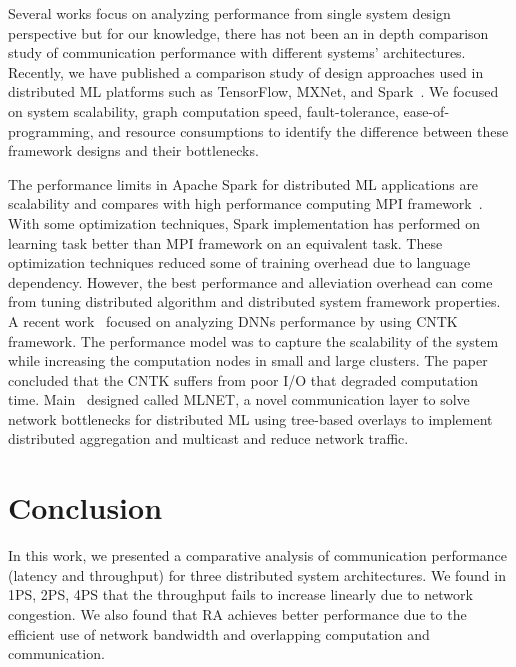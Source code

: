 \documentclass[conference]{IEEEtran}
\begin{document}

Several works focus on analyzing performance from single system design perspective but for our knowledge, there has not been an in depth comparison study of communication performance with different systems' architectures. Recently, we have published a comparison study of design approaches used in distributed ML platforms such as TensorFlow, MXNet, and Spark~\cite{KUO1}. We focused on system scalability, graph computation speed, fault-tolerance, ease-of-programming, and  resource consumptions to identify the difference between these framework designs and their bottlenecks. 

The performance limits in Apache Spark for distributed ML applications are scalability and compares with high performance computing MPI framework~\cite{Spark}. With some optimization techniques, Spark implementation has performed on learning task better than MPI framework on an equivalent task. These optimization techniques reduced some of training overhead due to language dependency. However, the best performance and alleviation overhead can come from tuning distributed algorithm and distributed system framework properties. A recent work~\cite{hashemi2016performance} focused on analyzing DNNs performance by using CNTK framework. The performance model was to capture the scalability of the system while increasing the computation nodes in small and large clusters. The paper concluded that the CNTK suffers from poor I/O that degraded computation time. Main~\cite{mai2015optimizing} designed called MLNET, a novel communication layer to solve network bottlenecks for distributed ML using tree-based overlays to implement distributed aggregation and multicast and reduce network traffic.


\section{Conclusion}
\label{sec:concl}

In this work, we presented a comparative analysis of communication performance (latency and throughput) for three distributed system architectures.  We found in 1PS, 2PS, 4PS that the throughput fails to increase linearly due to network congestion. We also found that RA achieves better performance due to the efficient use of network bandwidth and overlapping computation and communication. %
\end{document}
